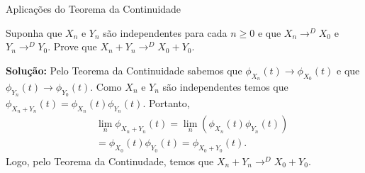 %
%
%
%
%
%
%

\begin{frame}{Aplicações do Teorema da Continuidade}

\begin{exem}
Suponha que $X_n$ e $Y_n$ são independentes para cada $n\geq 0$ e que $X_n\rightarrow^D X_0$ e $Y_n\rightarrow^D Y_0$. Prove que $X_n+Y_n\rightarrow^D X_0+Y_0$.

{\bf Solução:} Pelo Teorema da Continuidade sabemos que $\phi_{X_n}(t)\rightarrow\phi_{X_0}(t)$ e que $\phi_{Y_n}(t)\rightarrow\phi_{Y_0}(t)$. Como $X_n$ e $Y_n$ são independentes temos que $\phi_{X_n+Y_n}(t)=\phi_{X_n}(t)\phi_{Y_n}(t)$. Portanto,
\begin{eqnarray}
& & \lim_n\phi_{X_n+Y_n}(t)=\lim_n(\phi_{X_n}(t)\phi_{Y_n}(t))\nonumber\\
& & =\phi_{X_0}(t)\phi_{Y_0}(t)=\phi_{X_0+Y_0}(t).\nonumber
\end{eqnarray}
Logo, pelo Teorema da Continudade, temos que $X_n+Y_n\rightarrow^D X_0+Y_0$.
\end{exem}


\end{frame}


